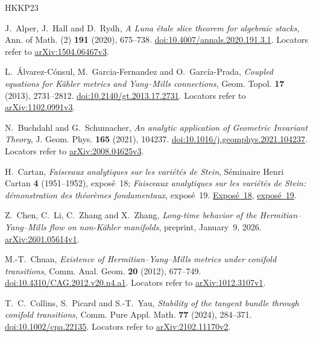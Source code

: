 \begin{thebibliography}{HKKP23}

J.~Alper, J.~Hall and D.~Rydh,
\emph{A Luna étale slice theorem for algebraic stacks},
Ann. of Math. (2) \textbf{191} (2020), 675--738.
\href{https://doi.org/10.4007/annals.2020.191.3.1}
{doi:10.4007/annals.2020.191.3.1}.
Locators refer to \href{https://arxiv.org/abs/1504.06467v3}{arXiv:1504.06467v3}.

L.~Álvarez-Cónsul, M.~Garcia-Fernandez and O.~García-Prada,
\emph{Coupled equations for Kähler metrics and Yang--Mills connections},
Geom. Topol. \textbf{17} (2013), 2731--2812.
\href{https://doi.org/10.2140/gt.2013.17.2731}{doi:10.2140/gt.2013.17.2731}.
Locators refer to \href{https://arxiv.org/abs/1102.0991v3}{arXiv:1102.0991v3}.

N.~Buchdahl and G.~Schumacher,
\emph{An analytic application of Geometric Invariant Theory},
J. Geom. Phys. \textbf{165} (2021), 104237.
\href{https://doi.org/10.1016/j.geomphys.2021.104237}
{doi:10.1016/j.geomphys.2021.104237}.
Locators refer to \href{https://arxiv.org/abs/2008.04625v3}{arXiv:2008.04625v3}.

H.~Cartan, \emph{Faisceaux analytiques sur les variétés de Stein},
Séminaire Henri Cartan \textbf{4} (1951--1952), exposé~18;
\emph{Faisceaux analytiques sur les variétés de Stein:
démonstration des théorèmes fondamentaux}, exposé~19.
\href{https://www.numdam.org/article/SHC_1951-1952__4__A18_0.pdf}
{Exposé~18},
\href{https://www.numdam.org/article/SHC_1951-1952__4__A19_0.pdf}
{exposé~19}.

Z.~Chen, C.~Li, C.~Zhang and X.~Zhang,
\emph{Long-time behavior of the Hermitian--Yang--Mills flow on
non-Kähler manifolds}, preprint, January~9, 2026.
\href{https://arxiv.org/abs/2601.05614v1}{arXiv:2601.05614v1}.

M.-T.~Chuan, \emph{Existence of Hermitian--Yang--Mills metrics under
conifold transitions}, Comm. Anal. Geom. \textbf{20} (2012), 677--749.
\href{https://doi.org/10.4310/CAG.2012.v20.n4.a1}
{doi:10.4310/CAG.2012.v20.n4.a1}.
Locators refer to \href{https://arxiv.org/abs/1012.3107v1}{arXiv:1012.3107v1}.

T.~C.~Collins, S.~Picard and S.-T.~Yau,
\emph{Stability of the tangent bundle through conifold transitions},
Comm. Pure Appl. Math. \textbf{77} (2024), 284--371.
\href{https://doi.org/10.1002/cpa.22135}{doi:10.1002/cpa.22135}.
Locators refer to \href{https://arxiv.org/abs/2102.11170v2}{arXiv:2102.11170v2}.


\end{thebibliography}
